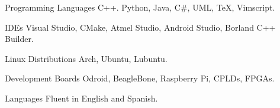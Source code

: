 
\begin{cvskills}


	\cvskill
		{Programming Languages}
			{C++. Python, Java, C\#, UML, \TeX, Vimscript.}

	\cvskill
		{IDEs}
			{Visual Studio, CMake, Atmel Studio, Android Studio, Borland C++ Builder.}

	\cvskill
		{Linux Distributions}
			{Arch, Ubuntu, Lubuntu.}

	\cvskill
		{Development Boards}
			{Odroid, BeagleBone, Raspberry Pi, CPLDs, FPGAs.}


	\cvskill
		{Languages}
			{Fluent in English and Spanish.}

\end{cvskills}
